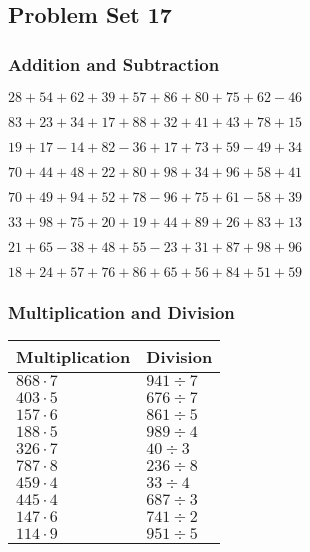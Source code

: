 \hypertarget{problem-set-17}{%
\subsection{Problem Set 17}\label{problem-set-17}}

\hypertarget{addition-and-subtraction}{%
\subsubsection{Addition and
Subtraction}\label{addition-and-subtraction}}

\(28+54+62+39+57+86+80+75+62-46\)

\(83+23+34+17+88+32+41+43+78+15\)

\(19+17-14+82-36+17+73+59-49+34\)

\(70+44+48+22+80+98+34+96+58+41\)

\(70+49+94+52+78-96+75+61-58+39\)

\(33+98+75+20+19+44+89+26+83+13\)

\(21+65-38+48+55-23+31+87+98+96\)

\(18+24+57+76+86+65+56+84+51+59\)

\hypertarget{multiplication-and-division}{%
\subsubsection{Multiplication and
Division}\label{multiplication-and-division}}

\begin{longtable}[]{@{}ll@{}}
\toprule
Multiplication & Division\tabularnewline
\midrule
\endhead
\(868\cdot7\) & \(941÷7\)\tabularnewline
\(403\cdot5\) & \(676÷7\)\tabularnewline
\(157\cdot6\) & \(861÷5\)\tabularnewline
\(188\cdot5\) & \(989÷4\)\tabularnewline
\(326\cdot7\) & \(40÷3\)\tabularnewline
\(787\cdot8\) & \(236÷8\)\tabularnewline
\(459\cdot4\) & \(33÷4\)\tabularnewline
\(445\cdot4\) & \(687÷3\)\tabularnewline
\(147\cdot6\) & \(741÷2\)\tabularnewline
\(114\cdot9\) & \(951÷5\)\tabularnewline
\bottomrule
\end{longtable}
